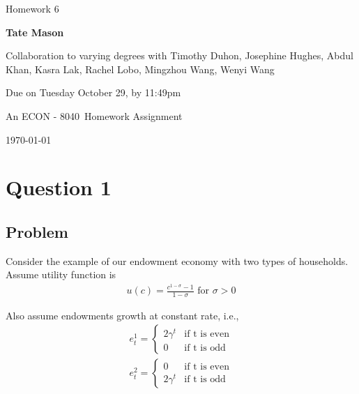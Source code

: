 \documentclass[10pt, a4paper]{article}
\newcommand\course{ECON - 8040}
\newcommand\hwnumber{6}
\newcommand\Information{Tate Mason}
\begin{document}
  \begin{titlepage}
    \begin{center}
      \vspace*{3cm}
            
      \vspace{1cm}
      \huge
      Homework \hwnumber
            
      \vspace{1.5cm}
      \Large
            
      \textbf{\Information}
            
      \vfill
      
      Collaboration to varying degrees with Timothy Duhon, Josephine Hughes, Abdul Khan, Kasra Lak, Rachel Lobo, Mingzhou Wang, Wenyi Wang
      \vspace{1cm}
      
      Due on Tuesday October 29, by 11:49pm

      \vspace{1cm}

      An \course \ Homework Assignment
            
      \vspace{1cm}
      \Large
      
      \today
            
    \end{center}
  \end{titlepage}

\section*{Question 1}
\subsection*{Problem}
Consider the example of our endowment economy with two types of households. Assume utility function is
\begin{gather*}
  u(c) = \frac{c^{1-\sigma}-1}{1-\sigma} \text{ for } \sigma > 0
\end{gather*}

Also assume endowments growth at constant rate, i.e.,
\begin{gather*}
  e^1_t = \begin{cases}
    2\gamma^t & \text{if t is even}\\
    0 & \text{if t is odd}
  \end{cases}\\
  e^2_t = \begin{cases}
    0 & \text{if t is even}\\
    2\gamma^t & \text{if t is odd}
  \end{cases}
\end{gather*}
\end{document}
